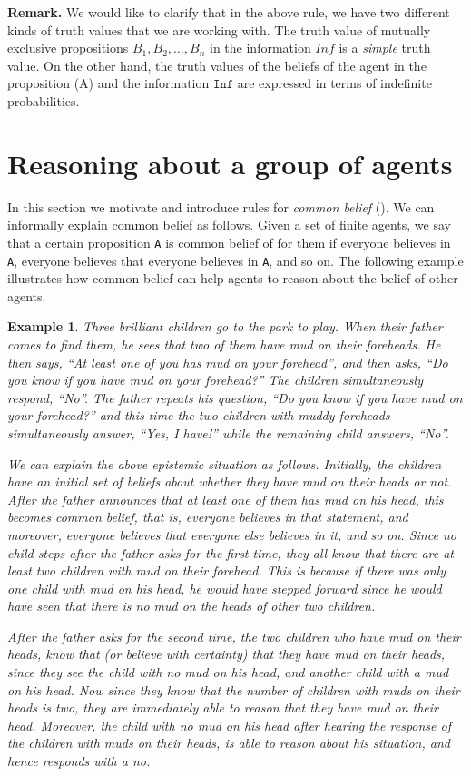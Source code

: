 \documentclass[12pt]{article}
\newtheorem{example}[theorem]{Example}
\begin{document}
 \textbf{Remark.} We would like to clarify that in the above rule, we have two different kinds of truth values that we are working with. The truth value of mutually exclusive propositions $B_1,B_2,\ldots,B_n$ in the information $Inf$ is a \emph{simple} truth value. On the other hand, the truth values of the beliefs of the agent in the proposition (A) and the information $\texttt{Inf}$ are expressed in terms of indefinite probabilities. 
 
\section{Reasoning about a group of agents} In this section we motivate and introduce rules for \emph{common belief} (\cite{DitmarschVerbrugge,Aumann95}). We can informally explain common belief as follows. Given a set of finite agents, we say that a certain proposition \texttt{A} is common belief of for them if everyone believes in \texttt{A}, everyone believes that everyone believes in \texttt{A}, and so on. The following example illustrates how common belief can help agents to reason about the belief of other agents. 


\begin{example}{\em
Three brilliant children go to the park to play. When their father
comes to find them, he sees that two of them have mud on their
foreheads. He then says, ``At least one of you has mud on your
forehead'', and then asks, ``Do you know if you have mud on
your forehead?'' The children simultaneously respond, ``No''.
The father repeats his question, ``Do you know if you have mud
on your forehead?'' and this time the two children with muddy
foreheads simultaneously answer, ``Yes, I have!'' while the remaining
child answers, ``No''.

We can explain the above epistemic situation as follows. Initially, the children have an initial set of beliefs about whether they have mud on their heads or not. After the father announces that at least one of them has mud on his head, this becomes common belief, that is, everyone believes in that statement, and moreover, everyone believes that everyone else believes in it, and so on. Since no child steps after the father asks for the first time, they all know that there are at least two children with mud on their forehead. This is because if there was only one child with mud on his head, he would have stepped forward since he would have seen that there is no mud on the heads of other two children.

After the father asks for the second time, the two children who have mud on their heads, know that (or believe with certainty) that they have mud on their heads, since they see the child with no mud on his head, and another child with a mud on his head. Now since they know that the number of children with muds on their heads is two, they are immediately able to reason that they have mud on their head. Moreover, the child with no mud on his head after hearing the response of the children with muds on their heads, is able to reason about his situation, and hence responds with a no.}
\end{example}
\end{document}
